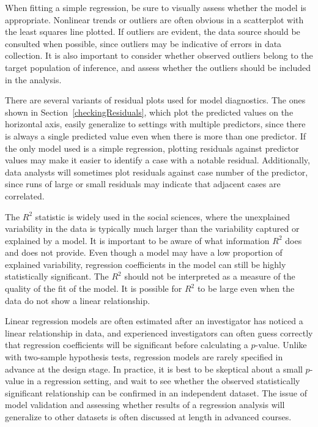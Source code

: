 When fitting a simple regression, be sure to visually assess whether the model is appropriate. Nonlinear trends or outliers are often obvious in a scatterplot with the least squares line plotted. If outliers are evident, the data source should be consulted when possible, since outliers may be indicative of errors in data collection. It is also important to consider whether observed outliers belong to the target population of inference, and assess whether the outliers should be included in the analysis.

There are several variants of residual plots used for model diagnostics. The ones shown in Section~\ref{checkingResiduals}, which plot the predicted values on the horizontal axis, easily generalize to settings with multiple predictors, since there is always a single predicted value even when there is more than one predictor. If the only model used is a simple regression, plotting residuals against predictor values may make it easier to identify a case with a notable residual. Additionally, data analysts will sometimes plot residuals against case number of the predictor, since runs of large or small residuals may indicate that adjacent cases are correlated.

The $R^2$ statistic is widely used in the social sciences, where the unexplained variability in the data is typically much larger than the variability captured or explained by a model. It is important to be aware of what information $R^2$ does and does not provide. Even though a model may have a low proportion of explained variability, regression coefficients in the model can still be highly statistically significant. The $R^2$ should not be interpreted as a measure of the quality of the fit of the model. It is possible for $R^2$ to be large even when the data do not show a linear relationship. 

Linear regression models are often estimated after an investigator has noticed a linear relationship in data, and experienced investigators can often guess correctly that regression coefficients will be significant before calculating a $p$-value. Unlike with two-sample hypothesis tests, regression models are rarely specified in advance at the design stage. In practice, it is best to be skeptical about a small $p$-value in a regression setting, and wait to see whether the observed statistically significant relationship can be confirmed in an independent dataset. The issue of model validation and assessing whether results of a regression analysis will generalize to other datasets is often discussed at length in advanced courses.


